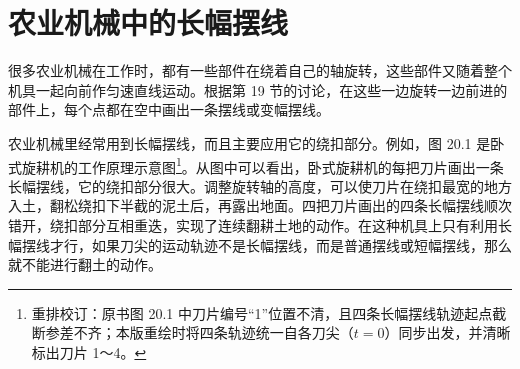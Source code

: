 \section{农业机械中的长幅摆线}

很多农业机械在工作时，都有一些部件在绕着自己的轴旋转，这些部件又随着整个机具一起向前作匀速直线运动。根据第 19 节的讨论，在这些一边旋转一边前进的部件上，每个点都在空中画出一条摆线或变幅摆线。

农业机械里经常用到长幅摆线，而且主要应用它的绕扣部分。例如，图 20.1 是卧式旋耕机的工作原理示意图\footnote{重排校订：原书图 20.1 中刀片编号“1”位置不清，且四条长幅摆线轨迹起点截断参差不齐；本版重绘时将四条轨迹统一自各刀尖（$t=0$）同步出发，并清晰标出刀片 1～4。}。从图中可以看出，卧式旋耕机的每把刀片画出一条长幅摆线，它的绕扣部分很大。调整旋转轴的高度，可以使刀片在绕扣最宽的地方入土，翻松绕扣下半截的泥土后，再露出地面。四把刀片画出的四条长幅摆线顺次错开，绕扣部分互相重迭，实现了连续翻耕土地的动作。在这种机具上只有利用长幅摆线才行，如果刀尖的运动轨迹不是长幅摆线，而是普通摆线或短幅摆线，那么就不能进行翻土的动作。

